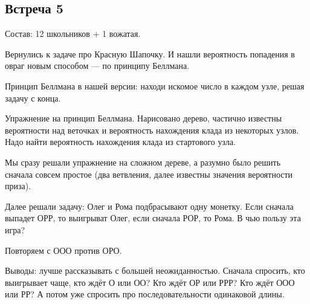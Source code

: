 \documentclass[a4paper, 12pt]{article}
\begin{document}
\begin{enumerate}
\section{Встреча 5}

Состав: 12 школьников + 1 вожатая.

Вернулись к задаче про Красную Шапочку. И нашли вероятность попадения в овраг новым способом — по принципу Беллмана.

Принцип Беллмана в нашей версии: находи искомое число в каждом узле, решая задачу с конца.

Упражнение на принцип Беллмана. Нарисовано дерево, частично известны вероятности над веточках и вероятность нахождения клада из некоторых узлов. Надо найти вероятность нахождения клада из стартового узла.

Мы сразу решали упражнение на сложном дереве, а разумно было решить сначала совсем простое (два ветвления, далее известны значения вероятности приза).

Далее решали задачу: Олег и Рома подбрасывают одну монетку. Если сначала выпадет ОРР, то выигрыват Олег, если сначала РОР, то Рома. В чью пользу эта игра?

Повторяем с ООО против ОРО.


Выводы: лучше рассказывать с большей неожиданностью. Сначала спросить, кто выигрывает чаще, кто ждёт О или ОО? Кто ждёт ОР или РРР?
Кто ждёт ООО или РР? А потом уже спросить про последовательности одинаковой длины.




\end{enumerate}
\end{document}
